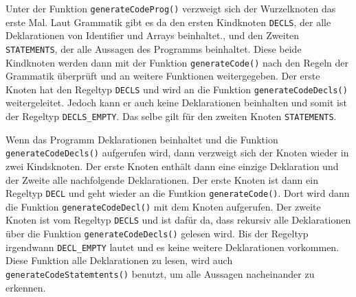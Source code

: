 

Unter der Funktion \texttt{generateCodeProg()} verzweigt sich der Wurzelknoten das erste Mal.  Laut Grammatik gibt es da den ersten Kindknoten \texttt{DECLS}, der alle Deklarationen von Identifier und Arrays beinhaltet., und den Zweiten \texttt{STATEMENTS}, der alle Aussagen des Programms beinhaltet. Diese beide Kindknoten werden dann mit der Funktion \texttt{generateCode()} nach den Regeln der Grammatik überprüft und an weitere Funktionen weitergegeben. Der erste Knoten hat den Regeltyp \texttt{DECLS} und wird an die Funktion \texttt{generateCodeDecls()} weitergeleitet. Jedoch kann er auch keine Deklarationen beinhalten und somit ist der  Regeltyp \texttt{DECLS\_EMPTY}. Das selbe gilt für den zweiten Knoten \texttt{STATEMENTS}.



Wenn das Programm Deklarationen beinhaltet und die Funktion \texttt{generateCodeDecls()} aufgerufen wird, dann verzweigt sich der Knoten wieder in zwei Kindsknoten. Der erste Knoten enthält dann eine einzige Deklaration und der Zweite alle nachfolgende Deklarationen. Der erste Knoten ist dann ein Regeltyp \texttt{DECL} und geht wieder an die Funtkion \texttt{generateCode()}. Dort wird dann die Funktion \texttt{generateCodeDecl()} mit dem Knoten aufgerufen. Der zweite Knoten ist vom Regeltyp \texttt{DECLS} und ist dafür da, dass rekursiv alle Deklarationen über die Funktion \texttt{generateCodeDecls()} gelesen wird. Bis der Regeltyp irgendwann \texttt{DECL\_EMPTY} lautet und es keine weitere Deklarationen vorkommen. Diese Funktion alle Deklarationen zu lesen, wird auch \texttt{generateCodeStatemtents()} benutzt, um alle Aussagen nacheinander zu erkennen.



